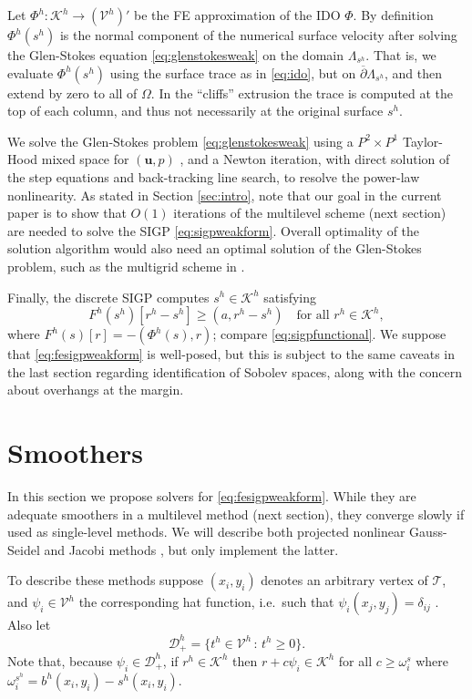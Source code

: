 \documentclass[letterpaper,final,12pt,reqno]{amsart}
\theoremstyle{claim}
\newcommand{\bu}{\mathbf{u}}
\newcommand{\ip}[2]{\left(#1,#2\right)}
\numberwithin{equation}{section}
\numberwithin{figure}{section}
\numberwithin{table}{section}
\numberwithin{theorem}{section}
\begin{document}
Let $\Phi^h:\mathcal{K}^h \to (\mathcal{V}^h)'$ be the FE approximation of the IDO $\Phi$.  By definition $\Phi^h(s^h)$ is the normal component of the numerical surface velocity after solving the Glen-Stokes equation \eqref{eq:glenstokesweak} on the domain $\Lambda_{s^h}$.  That is, we evaluate $\Phi^h(s^h)$ using the surface trace as in \eqref{eq:ido}, but on $\overline{\partial} \Lambda_{s^h}$, and then extend by zero to all of $\Omega$.  In the ``cliffs'' extrusion the trace is computed at the top of each column, and thus not necessarily at the original surface $s^h$.

We solve the Glen-Stokes problem \eqref{eq:glenstokesweak} using a $P^2 \times P^1$ Taylor-Hood mixed space for $(\bu,p)$ \cite{Elmanetal2014}, and a Newton iteration, with direct solution of the step equations and back-tracking line search, to resolve the power-law nonlinearity.  As stated in Section \ref{sec:intro}, note that our goal in the current paper is to show that $O(1)$ iterations of the multilevel scheme (next section) are needed to solve the SIGP \eqref{eq:sigpweakform}.  Overall optimality of the solution algorithm would also need an optimal solution of the Glen-Stokes problem, such as the multigrid scheme in \cite{IsaacStadlerGhattas2015}.

Finally, the discrete SIGP computes $s^h \in \mathcal{K}^h$ satisfying
\begin{equation}
F^h(s^h)[r^h - s^h] \ge \ip{a}{r^h-s^h} \quad \text{for all } r^h \in \mathcal{K}^h , \label{eq:fesigpweakform}
\end{equation}
where $F^h(s)[r] = - \ip{\Phi^h(s)}{r}$; compare \eqref{eq:sigpfunctional}.  We suppose that \eqref{eq:fesigpweakform} is well-posed, but this is subject to the same caveats in the last section regarding identification of Sobolev spaces, along with the concern about overhangs at the margin.


\section{Smoothers} \label{sec:smoothers}

In this section we propose solvers for \eqref{eq:fesigpweakform}.  While they are adequate smoothers in a multilevel method (next section), they converge slowly if used as single-level methods.  We will describe both projected nonlinear Gauss-Seidel and Jacobi methods \cite{KinderlehrerStampacchia1980}, but only implement the latter.

To describe these methods suppose $(x_i,y_i)$ denotes an arbitrary vertex of $\mathcal{T}$, and $\psi_i \in \mathcal{V}^h$ the corresponding hat function, i.e.~such that $\psi_i(x_j,y_j)=\delta_{ij}$ \cite{Elmanetal2014}.  Also let
\begin{equation}
\mathcal{D}_+^h = \{t^h \in \mathcal{V}^h \,:\, t^h \ge 0\}.  \label{eq:feDplus}
\end{equation}
Note that, because $\psi_i \in \mathcal{D}_+^h$, if $r^h \in \mathcal{K}^h$ then $r + c \psi_i \in \mathcal{K}^h$ for all $c\ge \omega_i^s$ where $\omega_i^{s^h} = b^h(x_i,y_i) - s^h(x_i,y_i)$.
\end{document}

